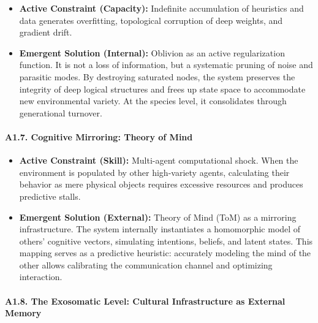 \documentclass[11pt,a4paper,oneside]{article} %
\providecommand{\tightlist}{%
  \setlength{\itemsep}{0pt}\setlength{\parskip}{0pt}}
\begin{document}
\begin{itemize}
\tightlist
\item
  \textbf{Active Constraint (Capacity):} Indefinite accumulation of
  heuristics and data generates overfitting, topological corruption of
  deep weights, and gradient drift.
\item
  \textbf{Emergent Solution (Internal):} Oblivion as an active
  regularization function. It is not a loss of information, but a
  systematic pruning of noise and parasitic modes. By destroying
  saturated nodes, the system preserves the integrity of deep logical
  structures and frees up state space to accommodate new environmental
  variety. At the species level, it consolidates through generational
  turnover.
\end{itemize}

\hypertarget{a1.7.-cognitive-mirroring-theory-of-mind}{%
\paragraph{A1.7. Cognitive Mirroring: Theory of
Mind}\label{a1.7.-cognitive-mirroring-theory-of-mind}}

\begin{itemize}
\tightlist
\item
  \textbf{Active Constraint (Skill):} Multi-agent computational shock.
  When the environment is populated by other high-variety agents,
  calculating their behavior as mere physical objects requires excessive
  resources and produces predictive stalls.
\item
  \textbf{Emergent Solution (External):} Theory of Mind (ToM) as a
  mirroring infrastructure. The system internally instantiates a
  homomorphic model of others' cognitive vectors, simulating intentions,
  beliefs, and latent states. This mapping serves as a predictive
  heuristic: accurately modeling the mind of the other allows
  calibrating the communication channel and optimizing interaction.
\end{itemize}

\hypertarget{a1.8.-the-exosomatic-level-cultural-infrastructure-as-external-memory}{%
\paragraph{A1.8. The Exosomatic Level: Cultural Infrastructure as
External
Memory}\label{a1.8.-the-exosomatic-level-cultural-infrastructure-as-external-memory}}
\end{document}
